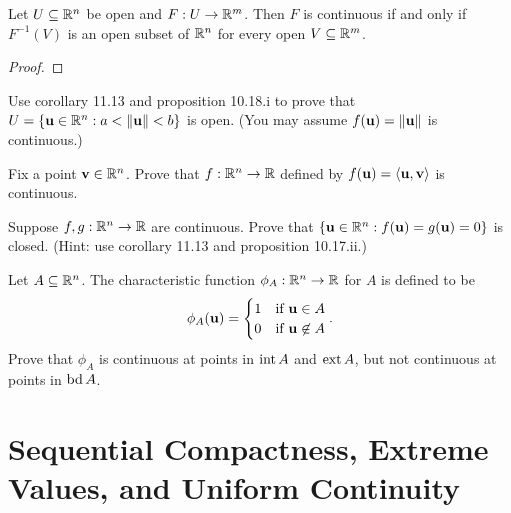 \documentclass[letterpaper, twoside, 12pt]{book}
\begin{document}
\begin{theorem}[11.12]
  Let \(U\subseteq\mathbb R^n\) be open and \(F:U\to\mathbb R^m\).
  Then \(F\) is continuous
  if and only if \(F^{-1}(V)\) is an open subset of \(\mathbb R^n\) for every
  open \(V\subseteq\mathbb R^m\).
\end{theorem}
\begin{proof}

\end{proof}

\begin{example}[11.15]
  Use corollary 11.13 and proposition 10.18.i to prove that
  \(U=\{\mathbf u\in\mathbb R^n:a<\|\mathbf u\|<b\}\) is open.
  (You may assume \(f(\mathbf u)=\|\mathbf u\|\) is continuous.)
\end{example}
\begin{solution}

\end{solution}

\begin{exercise}[3]
  Fix a point \(\mathbf v\in\mathbb R^n\). Prove that \(f:\mathbb R^n\to\mathbb R\)
  defined by \(f(\mathbf u)=\langle\mathbf u,\mathbf v\rangle\) is continuous.
\end{exercise}
\begin{solution}

\end{solution}

\begin{exercise}[6]
  Suppose \(f,g:\mathbb R^n\to\mathbb R\) are continuous. Prove that
  \(\{\mathbf u\in\mathbb R^n:f(\mathbf u)=g(\mathbf u)=0\}\) is closed.
  (Hint: use corollary 11.13 and proposition 10.17.ii.)
\end{exercise}
\begin{solution}

\end{solution}

\begin{exercise}[11]
  Let \(A\subseteq\mathbb R^n\). The characteristic function
  \(\phi_A:\mathbb R^n\to\mathbb R\) for \(A\) is defined to be
  \[
    \phi_A(\mathbf u) =
    \begin{cases}
      1 & \text{if } \mathbf u\in A \\
      0 & \text{if } \mathbf u\not\in A
    \end{cases}
  .\]
  Prove that \(\phi_A\) is continuous at points in \(\operatorname{int} A\)
  and \(\operatorname{ext} A\), but not continuous at points in \(\operatorname{bd} A\).
\end{exercise}


\section{Sequential Compactness, Extreme Values, and Uniform Continuity}
\end{document}

